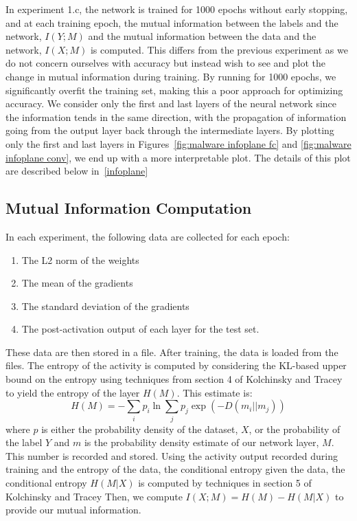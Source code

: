 In experiment 1.c, the network is trained for 1000 epochs without early stopping, and at each training epoch, the mutual information between the labels and the network, $I(Y; M)$ and the mutual information between the data and the network, $I(X; M)$ is computed.
This differs from the previous experiment as we do not concern ourselves with accuracy but instead wish to see and plot the change in mutual information during training.
By running for 1000 epochs, we significantly overfit the training set, making this a poor approach for optimizing accuracy.
We consider only the first and last layers of the neural network since the information tends in the same direction, with the propagation of information going from the output layer back through the intermediate layers.
By plotting only the first and last layers in Figures~\ref{fig:malware infoplane fc} and \ref{fig:malware infoplane conv}, we end up with a more interpretable plot.
The details of this plot are described below in~\ref{infoplane}

\subsection{Mutual Information Computation}\label{MI computation}
In each experiment, the following data are collected for each epoch:
\begin{enumerate}
	\item The L2 norm of the weights
	\item The mean of the gradients
	\item The standard deviation of the gradients
	\item The post-activation output of each layer for the test set. 
\end{enumerate}
These data are then stored in a file.
After training, the data is loaded from the files.
The entropy of the activity is computed by considering the KL-based upper bound on the entropy using techniques from section 4 of Kolchinsky and Tracey~\cite{kolchinsky2017estimating} to yield the entropy of the layer $H(M)$.
This estimate is:
\begin{equation}
	H(M) = -\sum_{i} p_i \ln \sum_{j} p_j \exp(-D(m_i || m_j))
\end{equation}
where $p$ is either the probability density of the dataset, $X$, or the probability of the label $Y$ and $m$ is the probability density estimate of our network layer, $M$.
This number is recorded and stored.
Using the activity output recorded during training and the entropy of the data, the conditional entropy given the data, the conditional entropy $H(M|X)$ is computed by techniques in section 5 of Kolchinsky and Tracey
Then, we compute $I(X;M) = H(M) - H(M|X)$ to provide our mutual information.

